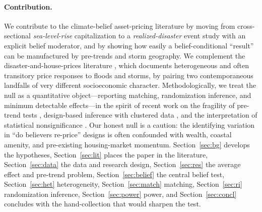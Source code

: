 \documentclass[12pt]{article}
\begin{document}
\paragraph{Contribution.} We contribute to the climate-belief asset-pricing literature
\citep{baldauf2020,bernstein2019,giglio2021} by moving from cross-sectional
\emph{sea-level-rise} capitalization to a \emph{realized-disaster} event study with an
explicit belief moderator, and by showing how easily a belief-conditional ``result'' can be
manufactured by pre-trends and storm geography. We complement the disaster-and-house-prices
literature \citep{ortega2018,bin2013,gallagher2014,hino2021}, which documents heterogeneous
and often transitory price responses to floods and storms, by pairing two contemporaneous
landfalls of very different socioeconomic character. Methodologically, we treat the null as a
quantitative object---reporting matching, randomization inference, and minimum detectable
effects---in the spirit of recent work on the fragility of pre-trend tests \citep{roth2022},
design-based inference with clustered data \citep{young2019}, and the interpretation of
statistical nonsignificance \citep{abadie2020}. Our honest null is a caution: the identifying
variation in ``do believers re-price'' designs is often confounded with wealth, coastal
amenity, and pre-existing housing-market momentum. Section~\ref{sec:bg} develops the
hypotheses, Section~\ref{sec:lit} places the paper in the literature, Section~\ref{sec:data}
the data and research design, Section~\ref{sec:res} the average effect and pre-trend problem,
Section~\ref{sec:belief} the central belief test, Section~\ref{sec:het} heterogeneity,
Section~\ref{sec:match} matching, Section~\ref{sec:ri} randomization inference,
Section~\ref{sec:power} power, and Section~\ref{sec:concl} concludes with the hand-collection
that would sharpen the test.
\end{document}
